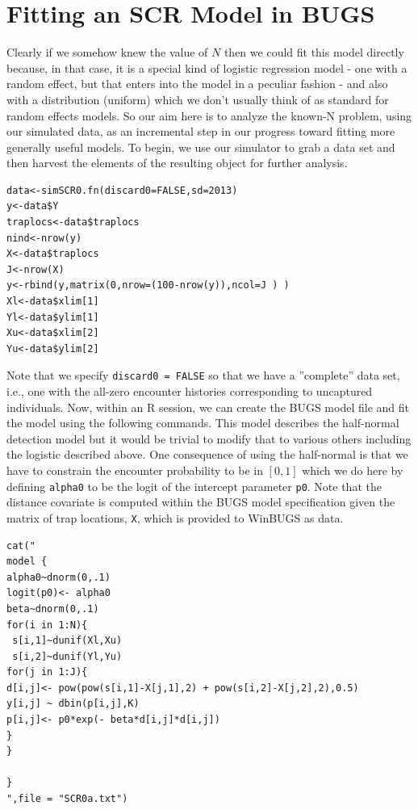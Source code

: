 \section{Fitting an SCR Model in BUGS}
\label{scr0.sec.winbugs1}
Clearly if we somehow knew the value of $N$ then we could fit this model directly because, in that case, it is a special kind of logistic regression model - one with a random effect, but that enters into the model in a peculiar fashion - and also with a distribution (uniform) which we don't usually think of as standard for random effects models.  So our aim here is to analyze the known-N problem, using our simulated data, as an incremental step in our progress toward fitting more generally useful models.
To begin, we use our simulator to grab a data set and then harvest the elements of the resulting object for further analysis. 
\begin{verbatim}
data<-simSCR0.fn(discard0=FALSE,sd=2013)
y<-data$Y
traplocs<-data$traplocs
nind<-nrow(y)
X<-data$traplocs
J<-nrow(X)
y<-rbind(y,matrix(0,nrow=(100-nrow(y)),ncol=J ) )
Xl<-data$xlim[1]
Yl<-data$ylim[1]
Xu<-data$xlim[2]
Yu<-data$ylim[2]
\end{verbatim}

Note that we specify \mbox{\tt discard0 = FALSE} so that we have a ''complete'' data set, i.e., one with the all-zero encounter histories corresponding to uncaptured individuals. Now, within an R session, we can create the BUGS model file and fit the model using the following commands. This model describes the half-normal detection model but it would be trivial to modify that to various others including the logistic described above. One consequence of using the half-normal is that we have to constrain the encounter probability to be in $[0,1]$ which we do here by defining \mbox{\tt alpha0} to be the logit of the intercept parameter \mbox{\tt p0}. Note that the distance covariate is computed within the BUGS model specification given the matrix of trap locations, \mbox{\tt X}, which is provided to WinBUGS as data. 
\begin{verbatim}
cat("
model {
alpha0~dnorm(0,.1)
logit(p0)<- alpha0
beta~dnorm(0,.1)
for(i in 1:N){
 s[i,1]~dunif(Xl,Xu)
 s[i,2]~dunif(Yl,Yu) 
for(j in 1:J){
d[i,j]<- pow(pow(s[i,1]-X[j,1],2) + pow(s[i,2]-X[j,2],2),0.5)
y[i,j] ~ dbin(p[i,j],K)
p[i,j]<- p0*exp(- beta*d[i,j]*d[i,j])
}
}

}
",file = "SCR0a.txt")
\end{verbatim}

